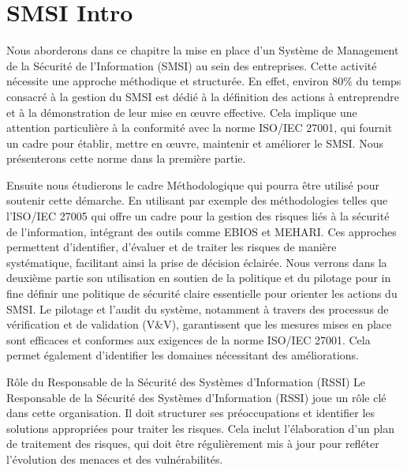 \section{SMSI Intro}

Nous aborderons dans ce chapitre la mise en place d'un Système de Management de la Sécurité de l'Information (SMSI) au sein des entreprises. Cette activité nécessite une approche méthodique et structurée. En effet, environ 80\% du temps consacré à la gestion du SMSI est dédié à la définition des actions à entreprendre et à la démonstration de leur mise en œuvre effective. Cela implique une attention particulière à la conformité avec la norme ISO/IEC 27001, qui fournit un cadre pour établir, mettre en œuvre, maintenir et améliorer le SMSI. Nous présenterons cette norme dans la première partie.

Ensuite nous étudierons le cadre Méthodologique qui pourra être utilisé pour soutenir cette démarche. En utilisant par exemple des méthodologies telles que l'ISO/IEC 27005 qui offre un cadre pour la gestion des risques liés à la sécurité de l'information, intégrant des outils comme EBIOS et MEHARI. Ces approches permettent d'identifier, d'évaluer et de traiter les risques de manière systématique, facilitant ainsi la prise de décision éclairée. Nous verrons dans la deuxième partie son utilisation en soutien de la politique et du pilotage pour in fine définir une politique de sécurité claire essentielle pour orienter les actions du SMSI. Le pilotage et l'audit du système, notamment à travers des processus de vérification et de validation (V&V), garantissent que les mesures mises en place sont efficaces et conformes aux exigences de la norme ISO/IEC 27001. Cela permet également d'identifier les domaines nécessitant des améliorations.

Rôle du Responsable de la Sécurité des Systèmes d'Information (RSSI)
Le Responsable de la Sécurité des Systèmes d'Information (RSSI) joue un rôle clé dans cette organisation. Il doit structurer ses préoccupations et identifier les solutions appropriées pour traiter les risques. Cela inclut l'élaboration d'un plan de traitement des risques, qui doit être régulièrement mis à jour pour refléter l'évolution des menaces et des vulnérabilités.

